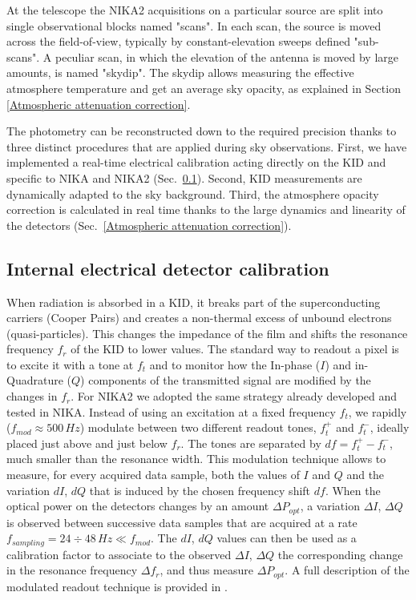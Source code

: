 \documentclass[]{aa} %
\begin{document}
At the telescope the NIKA2 acquisitions on a particular source are split into single observational blocks named "scans". In each scan, the source is moved across the field-of-view, typically by constant-elevation sweeps defined "sub-scans". A peculiar scan, in which the elevation of the antenna is moved by large amounts, is named "skydip". The skydip allows measuring the effective atmosphere temperature and get an average sky opacity, as explained in Section \ref{Atmospheric attenuation correction}.

The photometry can be reconstructed down to the required precision thanks to three distinct procedures that are applied during sky observations. First, we have implemented a real-time electrical calibration acting directly on the KID and specific to NIKA and NIKA2 (Sec.~\ref{Internal detectors calibration}). Second, KID measurements are dynamically adapted to the sky background. Third, the atmosphere opacity correction is calculated in real time thanks to the large dynamics and linearity of the detectors (Sec.~\ref{Atmospheric attenuation correction}).



\subsection{Internal electrical detector calibration}
\label{Internal detectors calibration}

When radiation is absorbed in a KID, it breaks part of the superconducting carriers (Cooper Pairs) and creates a non-thermal excess of unbound electrons (quasi-particles). This changes the impedance of the film and shifts the resonance frequency $f_r$ of the KID to lower values.
The standard way to readout a pixel is to excite it with a tone at $f_t$ and to monitor how the In-phase ($I$) and in-Quadrature ($Q$) components of the transmitted signal are modified by the changes in $f_r$. For NIKA2 we adopted the same strategy already developed and tested in NIKA. Instead of using an excitation at a fixed frequency $f_t$, we rapidly ($f_{mod} \approx 500\,Hz$) modulate between two different readout tones, $f_t^+$ and $f_t^-$, ideally placed just above and just below $f_r$. The tones are separated by $df=f_t^+-f_t^-$, much smaller than the resonance width. This modulation technique allows to measure, for every acquired data sample, both the values of $I$ and $Q$ and the variation $dI$, $dQ$ that is induced by the chosen frequency shift $df$. When the optical power on the detectors changes by an amount $\Delta P_{opt}$, a variation $\Delta I$, $\Delta Q$ is observed between successive data samples that are acquired at a rate $f_{sampling} = 24\div48\,Hz \ll  f_{mod} $. The $dI$, $dQ$ values can then be used as a calibration factor to associate to the observed $\Delta I$, $\Delta Q$ the corresponding change in the resonance frequency $\Delta f_r$, and thus measure $\Delta P_{opt}$. A full description of the modulated readout technique is provided in \cite{Calvo2013}.
\end{document}
